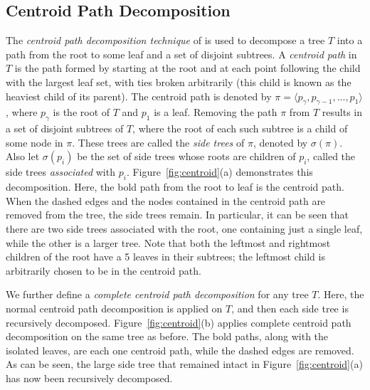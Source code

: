 \documentclass{article}
\begin{document}
    \subsection{Centroid Path Decomposition}

    The \textit{centroid path decomposition technique} of \cite{cole2000n} is used to decompose a tree $T$ into a path from the root to some leaf and a set of disjoint subtrees. A \textit{centroid path} in $T$ is the path formed by starting at the root and at each point following the child with the largest leaf set, with ties broken arbitrarily (this child is known as the heaviest child of its parent). The centroid path is denoted by $\pi = \langle p_{\gamma}, p_{\gamma - 1}, ..., p_1 \rangle$, where $p_{\gamma}$ is the root of $T$ and $p_1$ is a leaf. Removing the path $\pi$ from $T$ results in a set of disjoint subtrees of $T$, where the root of each such subtree is a child of some node in $\pi$. These trees are called the \textit{side trees} of $\pi$, denoted by $\sigma(\pi)$. Also let $\sigma(p_i)$ be the set of side trees whose roots are children of $p_i$, called the side trees \textit{associated} with $p_i$. Figure~\ref{fig:centroid}(a) demonstrates this decomposition. Here, the bold path from the root to leaf is the centroid path. When the dashed edges and the nodes contained in the centroid path are removed from the tree, the side trees remain. In particular, it can be seen that there are two side trees associated with the root, one containing just a single leaf, while the other is a larger tree. Note that both the leftmost and rightmost children of the root have a 5 leaves in their subtrees; the leftmost child is arbitrarily chosen to be in the centroid path.

    We further define a \textit{complete centroid path decomposition} for any tree $T$. Here, the normal centroid path decomposition is applied on $T$, and then each side tree is recursively decomposed. Figure~\ref{fig:centroid}(b) applies complete centroid path decomposition on the same tree as before. The bold paths, along with the isolated leaves, are each one centroid path, while the dashed edges are removed. As can be seen, the large side tree that remained intact in Figure~\ref{fig:centroid}(a) has now been recursively decomposed.
\end{document}
